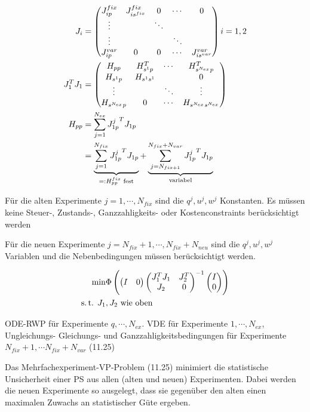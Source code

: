 \begin{align*}
J_i &= \begin{pmatrix} J_{ip}^{fix} & J_{is^{fix}}^{fix} & 0 & \cdots & 0 \\ \vdots && \ddots \\ \vdots &&& \ddots \\ J_{ip}^{var} & 0 & 0 &\cdots & J_{is^{var}}^{var} \end{pmatrix} i=1,2 \\
J_1^T J_1 &= \begin{pmatrix} H_{pp} & H_{s^1p}^T & \cdots & H_{s^{N_{ex}}p}^T \\ H_{s^1p} & H_{s^1 s^1} & & 0 \\ \vdots && \ddots  & \vdots\\ H_{s^{N_{ex}}p} & 0 & \cdots & H_{s^{N_{ex}}s^{N_{ex}}} \end{pmatrix} \\
H_{pp} &= \sum\limits_{j=1}^{N_{ex}} {J_{1p}^j}^T J_{1p} \\
&= \underbrace{\sum\limits_{j=1}^{N_{fix}} {J_{1p}^j}^T J_{1p}}_{=: H_{pp}^{fix} \text{ fest}} + \underbrace{\sum\limits_{j=N_{fix+1}}^{N_{fix} + N_{var}} {J_{1p}^j}^T J_{1p}}_{\text{variabel}} \\
\end{align*}


\bitm
\item Für die alten Experimente $j=1,\cdots,N_{fix}$ sind die $q^j, u^j, w^j$ Konstanten. Es müssen keine Steuer-, Zustands-, Ganzzahligkeits- oder Kostenconstraints berücksichtigt werden
\item Für die neuen Experimente $j = N_{fix} +1, \cdots, N_{fix} + N_{neu}$ sind die $q^j, u^j, w^j$ Variablen und die Nebenbedingungen müssen berücksichtigt werden.
\eitm

\begin{align*}
\min & \Phi \left( \begin{pmatrix} I & 0 \end{pmatrix} \begin{pmatrix} J_1^T J_1 & J_2^T \\ J_2 & 0 \end{pmatrix}^{-1} \begin{pmatrix} I \\ 0 \end{pmatrix} \right) \\
\text{s.\,t. } J_1 &, J_2 \text{ wie oben} \\
\end{align*}

ODE-RWP für Experimente $q,\cdots,N_{ex}$. VDE für Experimente $1,\cdots,N_{ex}$, Ungleichungs- Gleichungs- und Ganzzahligkeitsbedingungen für Experimente $N_{fix}+1, \cdots N_{fix}+N_{var}$ (11.25) 


Das Mehrfachexperiment-VP-Problem (11.25) minimiert die statistische Unsicherheit einer PS aus allen (alten und neuen) Experimenten. Dabei werden die neuen Experimente so ausgelegt, dass sie gegenüber den alten einen maximalen Zuwachs an statistischer Güte ergeben.

